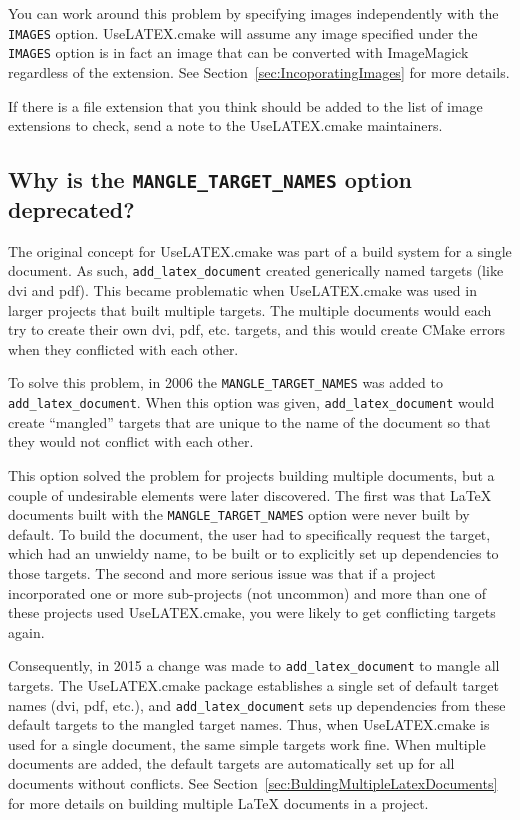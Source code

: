 \documentclass{article}
\newcommand*{\textfile}[1]{\textsf{#1}}
\newcommand*{\textcmake}[1]{\texttt{#1}}
\newcommand*{\textmaketarget}[1]{#1}
\newcommand*{\UseLATEX}{\textfile{UseLATEX.cmake}\xspace}
\newcommand*{\latex}{\LaTeX\xspace}
\newcommand*{\ald}{\textcmake{add\_latex\_document}\xspace}
\begin{document}
  You can work around this problem by specifying images independently with
  the \textcmake{IMAGES} option. \UseLATEX will assume any image specified
  under the \textcmake{IMAGES} option is in fact an image that can be
  converted with ImageMagick regardless of the extension. See
  Section~\ref{sec:IncoporatingImages} for more details.

  If there is a file extension that you think should be added to the list
  of image extensions to check, send a note to the \UseLATEX maintainers.

  \subsection{Why is the \textcmake{MANGLE\_TARGET\_NAMES} option deprecated?}
  \label{sec:Why_is_the_MANGLE_TARGET_NAMES_option_deprecated}

  The original concept for \UseLATEX was part of a build system for a
  single document. As such, \ald created generically named targets (like
  \textmaketarget{dvi} and \textmaketarget{pdf}). This became problematic
  when \UseLATEX was used in larger projects that built multiple targets.
  The multiple documents would each try to create their own
  \textmaketarget{dvi}, \textmaketarget{pdf}, etc. targets, and this would
  create CMake errors when they conflicted with each other.

  To solve this problem, in 2006 the \textcmake{MANGLE\_TARGET\_NAMES} was
  added to \ald. When this option was given, \ald would create ``mangled''
  targets that are unique to the name of the document so that they would
  not conflict with each other.

  This option solved the problem for projects building multiple documents,
  but a couple of undesirable elements were later discovered. The first was
  that \latex documents built with the \textcmake{MANGLE\_TARGET\_NAMES}
  option were never built by default. To build the document, the user had
  to specifically request the target, which had an unwieldy name, to be
  built or to explicitly set up dependencies to those targets. The second
  and more serious issue was that if a project incorporated one or more
  sub-projects (not uncommon) and more than one of these projects used
  \UseLATEX, you were likely to get conflicting targets again.

  Consequently, in 2015 a change was made to \ald to mangle all targets.
  The \UseLATEX package establishes a single set of default target names
  (\textmaketarget{dvi}, \textmaketarget{pdf}, etc.), and \ald sets up
  dependencies from these default targets to the mangled target names.
  Thus, when \UseLATEX is used for a single document, the same simple
  targets work fine. When multiple documents are added, the default targets
  are automatically set up for all documents without conflicts. See
  Section~\ref{sec:BuldingMultipleLatexDocuments} for more details on
  building multiple \latex documents in a project.
\end{document}
